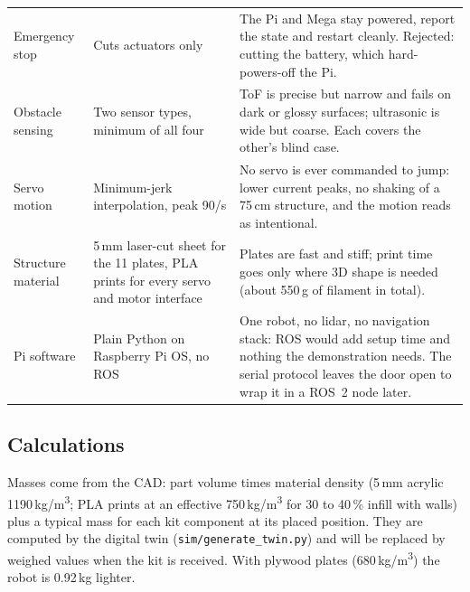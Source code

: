\documentclass[11pt,a4paper]{article}
\newcommand{\file}[1]{{\small\nolinkurl{#1}}}
\renewcommand{\deg}{\textdegree}
\begin{document}
\begin{table}[H]
\begin{tabularx}{\linewidth}{@{}P{33mm}P{45mm}L@{}}
Emergency stop & Cuts actuators only & The Pi and Mega stay powered, report the state and restart cleanly. Rejected: cutting the battery, which hard-powers-off the Pi.\\
Obstacle sensing & Two sensor types, minimum of all four & ToF is precise but narrow and fails on dark or glossy surfaces; ultrasonic is wide but coarse. Each covers the other's blind case.\\
Servo motion & Minimum-jerk interpolation, peak 90\deg/s & No servo is ever commanded to jump: lower current peaks, no shaking of a 75\,cm structure, and the motion reads as intentional.\\
Structure material & 5\,mm laser-cut sheet for the 11 plates, PLA prints for every servo and motor interface & Plates are fast and stiff; print time goes only where 3D shape is needed (about 550\,g of filament in total).\\
Pi software & Plain Python on Raspberry Pi OS, no ROS & One robot, no lidar, no navigation stack: ROS would add setup time and nothing the demonstration needs. The serial protocol leaves the door open to wrap it in a ROS~2 node later.\\
\bottomrule
\end{tabularx}
\end{table}

\subsection{Calculations}
Masses come from the CAD: part volume times material density (5\,mm acrylic 1190\,kg/m\textsuperscript{3}; PLA prints at an effective 750\,kg/m\textsuperscript{3} for 30 to 40\,\% infill with walls) plus a typical mass for each kit component at its placed position. They are computed by the digital twin (\file{sim/generate_twin.py}) and will be replaced by weighed values when the kit is received. With plywood plates (680\,kg/m\textsuperscript{3}) the robot is 0.92\,kg lighter.
\end{document}

